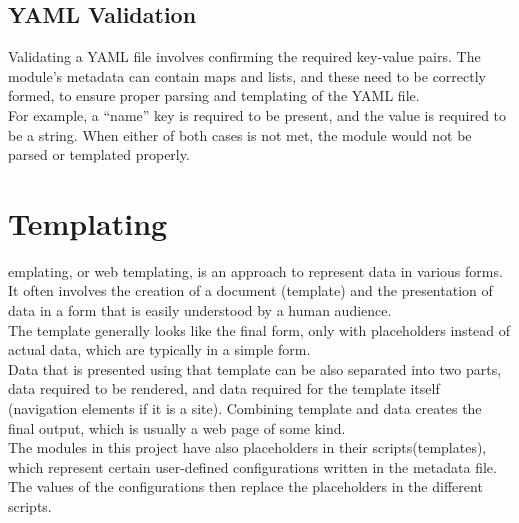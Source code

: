 \subsection{YAML Validation}
Validating a YAML file involves confirming the required key-value pairs. The module’s metadata can contain maps and lists, and these need to be correctly formed, to ensure proper parsing and templating of the YAML file.\\
For example, a “name” key is required to be present, and the value is required to be a string. When either of both cases is not met, the module would not be parsed or templated properly.


\section{Templating}
emplating, or web templating, is an approach to represent data in various forms. It often involves the creation of a document (template) and the presentation of data in a form that is easily understood by a human audience.\\
The template generally looks like the final form, only with placeholders instead of actual data, which are typically in a simple form.\\
Data that is presented using that template can be also separated into two parts, data required to be rendered, and data required for the template itself (navigation elements if it is a site). Combining template and data creates the final output, which is usually a web page of some kind\cite{templating}.\\
The modules in this project have also placeholders in their scripts(templates), which represent certain user-defined configurations written in the metadata file. The values of the configurations then replace the placeholders in the different scripts.\\
